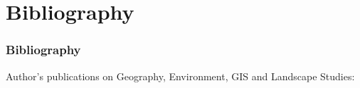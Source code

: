 \documentclass[pdflatex,compress,8pt,
	xcolor={dvipsnames,dvipsnames,svgnames,x11names,table},
	hyperref={colorlinks = true,
	breaklinks = true, 
	urlcolor = NavyBlue, 
	breaklinks = true}]{beamer}
\begin{document}

\section{Bibliography}
\begin{frame}[allowframebreaks]\frametitle{Bibliography}
\footnotesize{Author's publications on Geography, Environment, GIS and Landscape Studies:}
	\nocite{*}
	\printbibliography[heading=none]
\end{frame}


\end{document}
